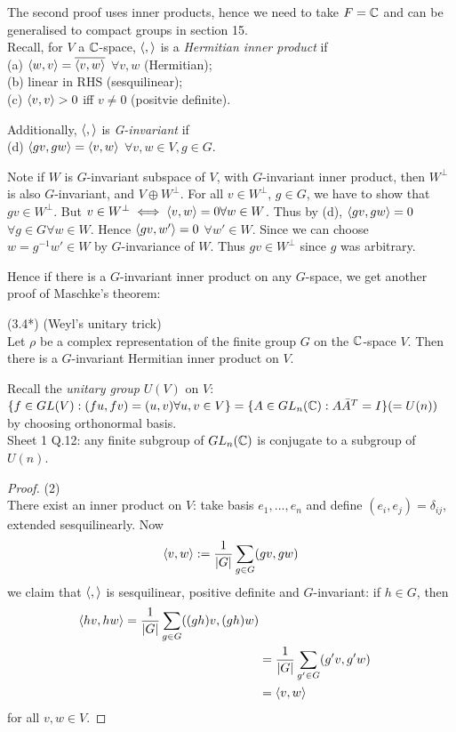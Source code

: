 \documentclass[a4paper]{article}
\begin{document}
\begin{thm}
The second proof uses inner products, hence we need to take $F = \mathbb{C}$ and can be generalised to compact groups in section 15.\\
Recall, for $V$ a $\mathbb{C}$-space, $\langle,\rangle$ is a \emph{Hermitian inner product} if\\
(a) $\langle w,v\rangle =\overline{\langle v,w\rangle}$ $\forall v,w$ (Hermitian);\\
(b) linear in RHS (sesquilinear);\\
(c) $\langle v,v\rangle > 0$ iff $v \neq 0$ (positvie definite).

Additionally, $\langle,\rangle$ is \emph{G-invariant} if \\
(d) $\langle gv,gw\rangle = \langle v,w\rangle$ $\forall v,w \in V, g \in G$.

Note if $W$ is $G$-invariant subspace of $V$, with $G$-invariant inner product, then $W^\perp$ is also $G$-invariant, and $V \oplus W^\perp$. For all $v \in W^\perp$, $g \in G$, we have to show that $gv \in W^\perp$. But $v \in W^\perp \iff \langle v,w\rangle = 0 \forall w \in W$. Thus by (d), $\langle gv,gw\rangle = 0$ $\forall g \in G \forall w \in W$. Hence $\langle gv,w'\rangle = 0$ $\forall w' \in W$. Since we can choose $w=g^{-1}w' \in W$ by $G$-invariance of $W$. Thus $gv \in W^\perp$ since $g$ was arbitrary.

Hence if there is a $G$-invariant inner product on any $G$-space, we get another proof of Maschke's theorem:

(3.4*) (Weyl's unitary trick)\\
Let $\rho$ be a complex representation of the finite group $G$ on the $\mathbb{C}$-space $V$. Then there is a $G$-invariant Hermitian inner product on $V$.
\begin{rem}
Recall the \emph{unitary group} $U(V)$ on $V$: $\{f \in GL(V): (fu,fv) = (u,v) \forall u,v \in V\} = \{A \in GL_n(\mathbb{C}) : A \bar{A}^T = I\} (= U(n))$ by choosing orthonormal basis.\\
Sheet 1 Q.12: any finite subgroup of $GL_n(\mathbb{C})$ is conjugate to a subgroup of $U(n)$.
\end{rem}

\begin{proof} (2)\\
There exist an inner product on $V$: take basis $e_1,...,e_n$ and define $(e_i,e_j) = \delta_{ij}$, extended sesquilinearly. Now
\begin{equation*}
\begin{aligned}
\langle v,w\rangle := \frac{1}{|G|} \sum_{g \in G} (gv,gw)
\end{aligned}
\end{equation*}
we claim that $\langle,\rangle$ is sesquilinear, positive definite and $G$-invariant: if $h \in G$, then
\begin{equation*}
\begin{aligned}
\langle hv,hw\rangle = \frac{1}{|G|} \sum_{g \in G} ((gh)v,(gh)w)\\
&= \frac{1}{|G|} \sum_{g' \in G} (g'v, g'w)\\
&= \langle v,w\rangle
\end{aligned}
\end{equation*}
for all $v,w \in V$.
\end{proof}
\end{thm}
\end{document}
